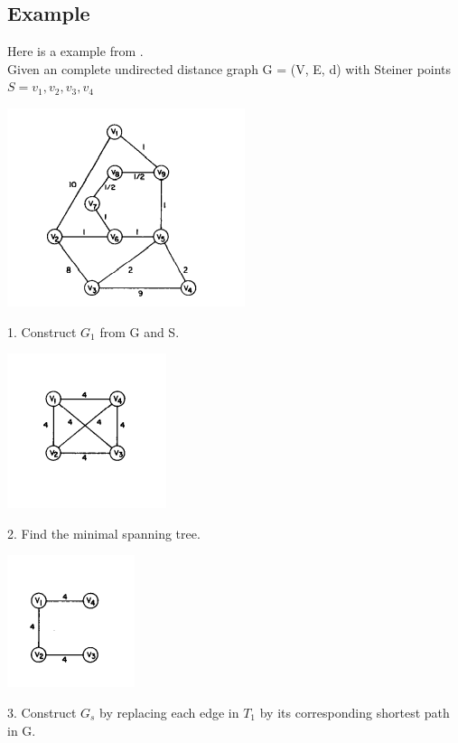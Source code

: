 \documentclass[letterpaper,11pt,twocolumn]{article}
\begin{document}
\subsection{Example}
Here is a example from \cite{main}.\\
Given an complete undirected distance graph G = (V, E, d) with Steiner points $S = {v_1, v_2, v_3, v_4}$\\
\begin{center}
\includegraphics[scale = 0.8]{a.png}\\
\end{center}
1. Construct $G_1$ from G and S.\\
\begin{center}
\includegraphics[scale = 0.8]{b.png}\\    
\end{center}
2. Find the minimal spanning tree.\\
\begin{center}
    \includegraphics[scale = 0.8]{c.png}
\end{center}
3. Construct $G_s$ by replacing each edge in $T_1$ by its corresponding shortest path in G.
\end{document}
